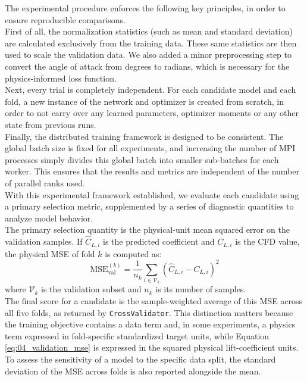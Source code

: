 The experimental procedure enforces the following key principles, in order to ensure reproducible comparisons.\\
First of all, the normalization statistics (such as mean and standard deviation) are calculated exclusively from the training data. These same statistics are then used to scale the validation data. We also added a minor preprocessing step to convert the angle of attack from degrees to radians, which is necessary for the physics-informed loss function.\\
Next, every trial is completely independent. For each candidate model and each fold, a new instance of the network and optimizer is created from scratch, in order to not carry over any learned parameters, optimizer moments or any other state from previous runs.\\
Finally, the distributed training framework is designed to be consistent. The global batch size is fixed for all experiments, and increasing the number of MPI processes simply divides this global batch into smaller sub-batches for each worker. This ensures that the results and metrics are independent of the number of parallel ranks used.\\

With this experimental framework established, we evaluate each candidate using a primary selection metric, supplemented by a series of diagnostic quantities to analyze model behavior.\\

The primary selection quantity is the physical-unit mean squared error on the validation samples. If $\hat{C}_{L,i}$ is the predicted coefficient and $C_{L,i}$ is the CFD value, the physical MSE of fold $k$ is computed as:
\begin{equation}
    \mathrm{MSE}_{\mathrm{val}}^{(k)} =
    \frac{1}{n_k}\sum_{i\in\mathcal{V}_k}
    \left(\hat{C}_{L,i}-C_{L,i}\right)^2
    \label{eq:04_validation_mse}
\end{equation}
where $\mathcal{V}_k$ is the validation subset and $n_k$ is its number of samples.\\
The final score for a candidate is the sample-weighted 
average of this MSE across all five folds, as returned by \texttt{CrossValidator}. This distinction matters because the training objective contains a data term and, in some experiments, a physics term expressed in fold-specific standardized target units, while Equation \eqref{eq:04_validation_mse} is expressed in the squared physical lift-coefficient units. To assess the sensitivity of a model to the specific data split, the standard deviation of the MSE across folds is also reported alongside the mean.\\


